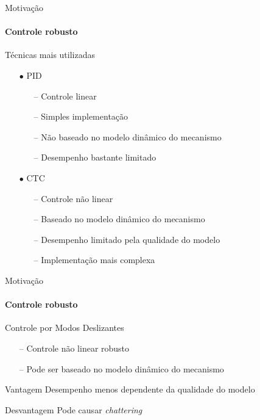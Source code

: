 \documentclass[25pt,landscape]{beamer}
\begin{document}
\begin{frame}{Motiva\c{c}\~ao}
    \framesubtitle{Controle robusto}
    \pause
    \begin{block}{T\'ecnicas mais utilizadas}
    	\begin{itemize}
    		\pause
    		\item[$\bullet$] PID
    		\begin{itemize}
    			\pause
    			\item[--] Controle linear \\[4pt]
    			\item[--] Simples implementa\c{c}\~ao \\[4pt]
    			\item[--] N\~ao baseado no modelo din\^amico do mecanismo \\[4pt]
    			\item[--] Desempenho bastante limitado \\[4pt]
    		\end{itemize}
    		\pause
    		\item[$\bullet$] CTC
    		\begin{itemize}
    			\pause
    			\item[--] Controle n\~ao linear \\[4pt]
    			\item[--] Baseado no modelo din\^amico do mecanismo \\[4pt]
    			\item[--] Desempenho limitado pela qualidade do modelo \\[4pt]
    			\item[--] Implementa\c{c}\~ao mais complexa \\[4pt]
    		\end{itemize}
    	\end{itemize}
    \end{block}
\end{frame}

\begin{frame}{Motiva\c{c}\~ao}
    \framesubtitle{Controle robusto}
    \pause
    \begin{block}{Controle por Modos Deslizantes}
    	\begin{itemize}
    		\pause
    		\item[--] Controle n\~ao linear robusto \\[4pt]
    		\item[--] Pode ser baseado no modelo din\^amico do mecanismo \\[4pt]
    	\end{itemize}
    \end{block}
    \pause
    \begin{exampleblock}{Vantagem}
    	Desempenho menos dependente da qualidade do modelo
    \end{exampleblock}
    \pause
    \begin{exampleblock}{Desvantagem}
        Pode causar \emph{chattering}
    \end{exampleblock}
\end{frame}
\end{document}
